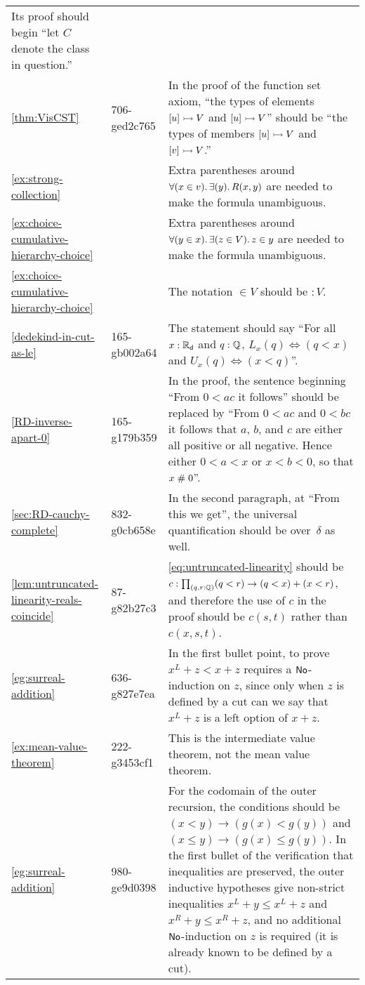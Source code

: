 \documentclass[
%
%
11pt %
]{article}
\begin{document}
\begin{longtable}{llp{10.5cm}}
  Its proof should begin ``let $C$ denote the class in question.''\\
  \cref{thm:VisCST}
  & 706-ged2c765
  & In the proof of the function set axiom, ``the types of elements $[u] \rightarrowtail V$ and $[u] \rightarrowtail V$'' should be ``the types of members $[u] \rightarrowtail V$ and $[v] \rightarrowtail V$.''\\
  \cref{ex:strong-collection}
  & %
  & Extra parentheses around $\fall{x\in v}\exis{y} R(x,y)$ are needed to make the formula unambiguous.\\
  \cref{ex:choice-cumulative-hierarchy-choice}
  & %
  & Extra parentheses around $\fall{y\in x}\exis{z\in V} z\in y$ are needed to make the formula unambiguous.\\
  \cref{ex:choice-cumulative-hierarchy-choice}
  & %
  & The notation $\in V$ should be $:V$.\\
  \cref{dedekind-in-cut-as-le}
  & 165-gb002a64
  & The statement should say ``For all $x : \mathbb{R}_\mathsf{d}$ and $q : \mathbb{Q}$, $L_x(q) \Leftrightarrow (q < x)$ and $U_x(q)
  \Leftrightarrow (x < q)$''.\\
  \cref{RD-inverse-apart-0}
  & 165-g179b359
  & In the proof, the sentence beginning ``From $0<ac$ it follows'' should be replaced by ``From $0 < a c$ and $0 < b c$ it follows
  that $a$, $b$, and $c$ are either all positive or all negative.
  Hence either $0 < a < x$ or $x < b < 0$, so that $x \mathrel{\#} 0$''.\\
  \cref{sec:RD-cauchy-complete}
  & 832-g0cb658e
  & In the second paragraph, at ``From this we get'', the universal quantification should be over~$\delta$ as well.\\
  \cref{lem:untruncated-linearity-reals-coincide}
  & 87-g82b27c3
  & \eqref{eq:untruncated-linearity} should be $c:\prd{q, r : \Q} (q < r) \to (q < x) + (x < r)$, and therefore the use of $c$ in the proof should be $c(s,t)$ rather than $c(x,s,t)$.\\
  \cref{eg:surreal-addition}
  & 636-g827e7ea
  & In the first bullet point, to prove $x^L+z < x+z$ requires a $\mathsf{No}$-induction on $z$, since only when $z$ is defined by a cut can we say that $x^L+z$ is a left option of $x+z$.\\
  \cref{ex:mean-value-theorem}
  & 222-g3453cf1
  & This is the intermediate value theorem, not the mean value theorem.\\
  \cref{eg:surreal-addition}
  & 980-ge9d0398
  & For the codomain of the outer recursion, the conditions should be $(x<y) \to (g(x)<g(y))$ and $(x\le y) \to (g(x)\le g(y))$.  In the first bullet of the verification that inequalities are preserved, the outer inductive hypotheses give non-strict inequalities $x^L+y \le x^L+z$ and $x^R+ y \le x^R+z$, and no additional $\mathsf{No}$-induction on $z$ is required (it is already known to be defined by a cut).\\

\end{longtable}
\end{document}
